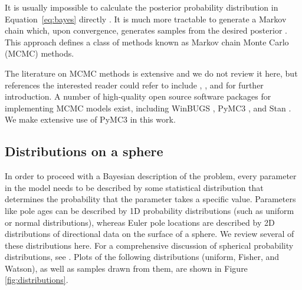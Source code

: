 \documentclass[11pt,letterpaper]{article}
\begin{document}
It is usually impossible to calculate the posterior probability distribution in Equation~\eqref{eq:bayes} directly \citep{Davidson-Pilon2015a}.  It is much more tractable to generate a Markov chain which, upon convergence, generates samples from the desired posterior \citep{Gelman2013a}. This approach defines a class of methods known as Markov chain Monte Carlo (MCMC) methods.

The literature on MCMC methods is extensive and we do not review it here, but references the interested reader could refer to include \cite{Gelman1996a}, \cite{Sambridge2013a}, and \cite{Davidson-Pilon2015a} for further introduction. A number of high-quality open source software packages for implementing MCMC models exist, including WinBUGS \citep{Lunn2000a}, PyMC3 \citep{Salvatier2016a}, and Stan \citep{Carpenter2017a}. We make extensive use of PyMC3 in this work.

\subsection*{Distributions on a sphere}

In order to proceed with a Bayesian description of the problem, every parameter in the model needs to be described by some statistical distribution that determines the probability that the parameter takes a specific value. Parameters like pole ages can be described by 1D probability distributions (such as uniform or normal distributions), whereas Euler pole locations are described by 2D distributions of directional data on the surface of a sphere. We review several of these distributions here. For a comprehensive discussion of spherical probability distributions, see \cite{Fisher1987b}. Plots of the following distributions (uniform, Fisher, and Watson), as well as samples drawn from them, are shown in Figure \ref{fig:distributions}. 
\end{document}
